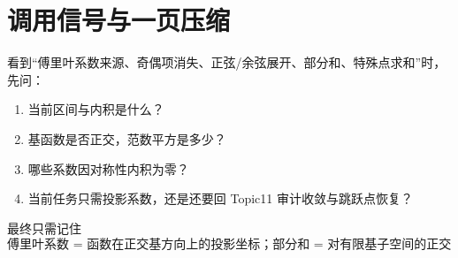 \documentclass[profile=standard]{ipara-handbook}
\begin{document}
\section{调用信号与一页压缩}
看到“傅里叶系数来源、奇偶项消失、正弦/余弦展开、部分和、特殊点求和”时，先问：
\begin{enumerate}
\item 当前区间与内积是什么？
\item 基函数是否正交，范数平方是多少？
\item 哪些系数因对称性内积为零？
\item 当前任务只需投影系数，还是还要回 Topic11 审计收敛与跳跃点恢复？
\end{enumerate}

最终只需记住
\[
\boxed{
\text{傅里叶系数 = 函数在正交基方向上的投影坐标；部分和 = 对有限基子空间的正交投影。}
}
\]
\end{document}
